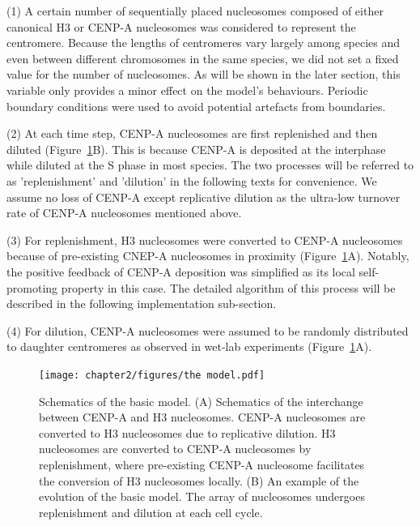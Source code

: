 (1) A certain number of sequentially placed nucleosomes composed of either canonical H3 or CENP-A nucleosomes was considered to represent the centromere. Because the lengths of centromeres vary largely among species and even between different chromosomes in the same species, we did not set a fixed value for the number of nucleosomes. As will be shown in the later section, this variable only provides a minor effect on the model's behaviours. Periodic boundary conditions were used to avoid potential artefacts from boundaries. 

(2) At each time step, CENP-A nucleosomes are first replenished and then diluted (Figure~\ref{fig:basicmodelschematics}B). This is because CENP-A is deposited at the interphase while diluted at the S phase in most species. The two processes will be referred to as 'replenishment' and 'dilution' in the following texts for convenience. We assume no loss of CENP-A except replicative dilution as the ultra-low turnover rate of CENP-A nucleosomes mentioned above. 

(3) For replenishment, H3 nucleosomes were converted to CENP-A nucleosomes because of pre-existing CNEP-A nucleosomes in proximity (Figure~\ref{fig:basicmodelschematics}A). Notably, the positive feedback of CENP-A deposition was simplified as its local self-promoting property in this case. The detailed algorithm of this process will be described in the following implementation sub-section. 

(4) For dilution, CENP-A nucleosomes were assumed to be randomly distributed to daughter centromeres as observed in wet-lab experiments (Figure~\ref{fig:basicmodelschematics}A). 

\begin{figure}[htbp]
  \centering
  \texttt{[image: chapter2/figures/the model.pdf]}
  \caption[Schematics of the basic model]{Schematics of the basic model. (A) Schematics of the interchange between CENP-A and H3 nucleosomes. CENP-A nucleosomes are converted to H3 nucleosomes due to replicative dilution. H3 nucleosomes are converted to CENP-A nucleosomes by replenishment, where pre-existing CENP-A nucleosome facilitates the conversion of H3 nucleosomes locally. (B) An example of the evolution of the basic model. The array of nucleosomes undergoes replenishment and dilution at each cell cycle. }
  \label{fig:basicmodelschematics}
\end{figure}


